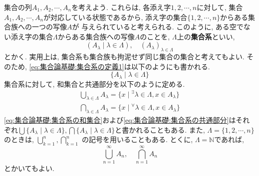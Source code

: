         集合の列$A_1,A_2,\cdots,A_n$を考えよう. これらは, 各添え字$1,2,\cdots,n$に対して, 集合$A_1,A_2,\cdots,A_n$が対応している状態であるから, 添え字の集合$\{1,2,\cdots,n\}$からある集合族への一つの写像$A$が
        与えられていると考えられる. このように, ある空でない添え字の集合$\Lambda$からある集合族への写像$A$のことを, $\Lambda$上の\textbf{集合系}といい, 
        \begin{equation}
            (A_\lambda\mid\lambda \in \Lambda),\quad (A_\lambda)_{\lambda\in\Lambda} \label{eq:集合論基礎:集合系の定義1}
        \end{equation}
        とかく. 実用上は, 集合系も集合族も拘泥せず同じ集合の集合と考えてもよい. そのため, \eqref{eq:集合論基礎:集合系の定義1}は以下のようにも書かれる.
        \begin{equation}
            \{A_\lambda\mid \lambda\in\Lambda\} \label{eq:集合論基礎:集合系の定義2}
        \end{equation}
        集合系に対して, 和集合と共通部分を以下のように定める.
        \begin{align}
            \bigcup_{\lambda\in \Lambda} A_\lambda = \{x\mid {}^\exists \lambda \in \Lambda,x\in A_\lambda\} \label{eq:集合論基礎:集合系の和集合}\\
            \bigcap_{\lambda\in \Lambda} A_\lambda = \{x\mid {}^\forall \lambda \in \Lambda,x\in A_\lambda\} \label{eq:集合論基礎:集合系の共通部分}
        \end{align}
        \eqref{eq:集合論基礎:集合系の和集合}および\eqref{eq:集合論基礎:集合系の共通部分}はそれぞれ$\bigcup \{A_\lambda\mid\lambda\in\Lambda\},\bigcap \{A_\lambda\mid\lambda\in\Lambda\}$と書かれることもある. また, $\Lambda=\{1,2,\cdots,n\}$のときは, $\displaystyle\bigcup_{k=1}^{n},\bigcap_{k=1}^{n}$
        の記号を用いることもある. とくに, $\Lambda = \mathbb{N}$であれば, 
        \begin{equation*}
            \bigcup_{n=1}^{\infty}A_n,\quad \bigcap_{n=1}^{\infty}A_n
        \end{equation*}
        とかいてもよい. 

